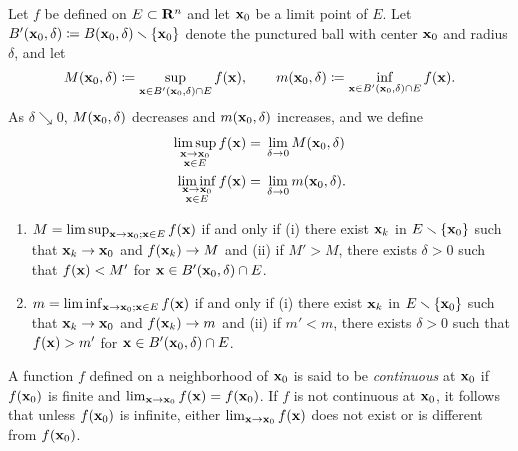 Let $f$ be defined on $E\subset\mathbf{R}^n$ and let $\mathbf{x}_0$ be a limit point of
$E$. Let $B'(\mathbf{x}_0,\delta)\coloneqq B(\mathbf{x}_0,\delta)\smallsetminus\{\mathbf{x}_0\}$
denote the punctured ball with center $\mathbf{x}_0$ and radius $\delta$, and let
\begin{equation}
\label{eq:sup-inf-ball}
M(\mathbf{x}_0,\delta)\coloneqq\sup_{\mathbf{x}\in B'(\mathbf{x}_0,\delta)\cap E}
f(\mathbf{x}),\qquad
m(\mathbf{x}_0,\delta)\coloneqq\inf_{\mathbf{x}\in B'(\mathbf{x}_0,\delta)\cap E}
f(\mathbf{x}).
\end{equation}
As $\delta\searrow 0$, $M(\mathbf{x}_0,\delta)$ decreases and $m(\mathbf{x}_0,\delta)$
increases, and we define
\begin{equation}
  \label{eq:ball-limsup-liminf}
\begin{aligned}
\limsup_{\substack{\mathbf{x}\to\mathbf{x}_0\\\mathbf{x}\in E}} f(\mathbf{x})
={}&\lim_{\delta\to 0}M(\mathbf{x}_0,\delta)\\
\liminf_{\substack{\mathbf{x}\to\mathbf{x}_0\\\mathbf{x}\in E}} f(\mathbf{x})
={}&\lim_{\delta\to 0}m(\mathbf{x}_0,\delta).
\end{aligned}
\end{equation}
\begin{theorem}[1.14]
\begin{enumerate}[label=\textnormal{(\alph*)}]
\item $M=\limsup_{\mathbf{x}\to\mathbf{x}_0;\mathbf{x}\in E} f(\mathbf{x})$ if and only if
  \textnormal{(i)} there exist ${\mathbf{x}_k}$ in $E\smallsetminus\{\mathbf{x}_0\}$ such that
  $\mathbf{x}_k\to\mathbf{x}_0$ and $f(\mathbf{x}_k)\to M$ and \textnormal{(ii)} if $M'>M$,
  there exists $\delta>0$ such that $f(\mathbf{x})<M'$ for $\mathbf{x}\in
  B'(\mathbf{x}_0,\delta)\cap E$.
\item $m=\liminf_{\mathbf{x}\to\mathbf{x}_0;\mathbf{x}\in E} f(\mathbf{x})$ if and only if
  \textnormal{(i)} there exist ${\mathbf{x}_k}$ in $E\smallsetminus\{\mathbf{x}_0\}$ such that
  $\mathbf{x}_k\to\mathbf{x}_0$ and $f(\mathbf{x}_k)\to m$ and \textnormal{(ii)} if $m'<m$,
  there exists $\delta>0$ such that $f(\mathbf{x})>m'$ for $\mathbf{x}\in
  B'(\mathbf{x}_0,\delta)\cap E$.
\end{enumerate}
\end{theorem}

A function $f$ defined on a neighborhood of $\mathbf{x}_0$ is said to be
\emph{continuous} at $\mathbf{x}_0$ if $f(\mathbf{x}_0)$ is finite and
$\lim_{\mathbf{x}\to\mathbf{x}_0}f(\mathbf{x})=f(\mathbf{x}_0)$. If $f$ is not continuous at
$\mathbf{x}_0$, it follows that unless $f(\mathbf{x}_0)$ is infinite, either
$\lim_{\mathbf{x}\to\mathbf{x}_0} f(\mathbf{x})$ does not exist or is different from
$f(\mathbf{x}_0)$.

